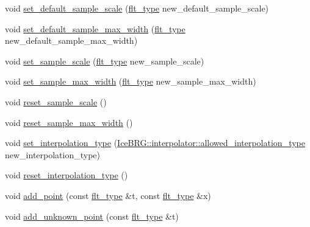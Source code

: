 \begin{DoxyCompactItemize}
\item 
void \hyperlink{classIceBRG_1_1interpolator__derivative_a626f3afc4eb2914fd03448cee55f1c0a}{set\+\_\+default\+\_\+sample\+\_\+scale} (\hyperlink{lib_2IceBRG__main_2common_8h_ad0f130a56eeb944d9ef2692ee881ecc4}{flt\+\_\+type} new\+\_\+default\+\_\+sample\+\_\+scale)
\item 
void \hyperlink{classIceBRG_1_1interpolator__derivative_a02d5c44e6d5a71e12e4d7bd07787bfc9}{set\+\_\+default\+\_\+sample\+\_\+max\+\_\+width} (\hyperlink{lib_2IceBRG__main_2common_8h_ad0f130a56eeb944d9ef2692ee881ecc4}{flt\+\_\+type} new\+\_\+default\+\_\+sample\+\_\+max\+\_\+width)
\item 
void \hyperlink{classIceBRG_1_1interpolator__derivative_a53a00f6c302b5f4a754e4274361fbd0e}{set\+\_\+sample\+\_\+scale} (\hyperlink{lib_2IceBRG__main_2common_8h_ad0f130a56eeb944d9ef2692ee881ecc4}{flt\+\_\+type} new\+\_\+sample\+\_\+scale)
\item 
void \hyperlink{classIceBRG_1_1interpolator__derivative_a44ea2c1dfe2fc70feef1e1bc3ed14ae1}{set\+\_\+sample\+\_\+max\+\_\+width} (\hyperlink{lib_2IceBRG__main_2common_8h_ad0f130a56eeb944d9ef2692ee881ecc4}{flt\+\_\+type} new\+\_\+sample\+\_\+max\+\_\+width)
\item 
void \hyperlink{classIceBRG_1_1interpolator__derivative_ac7af1733b2e1d0d0d712cd5d48be90f9}{reset\+\_\+sample\+\_\+scale} ()
\item 
void \hyperlink{classIceBRG_1_1interpolator__derivative_a32c7264c3963118ff9e4c79fd8026b85}{reset\+\_\+sample\+\_\+max\+\_\+width} ()
\item 
void \hyperlink{classIceBRG_1_1interpolator__derivative_a8ceb82dfab0402bee0aa73d04ecc0bf4}{set\+\_\+interpolation\+\_\+type} (\hyperlink{classIceBRG_1_1interpolator_af85c1c6a292cff6fa033c8884377544a}{Ice\+B\+R\+G\+::interpolator\+::allowed\+\_\+interpolation\+\_\+type} new\+\_\+interpolation\+\_\+type)
\item 
void \hyperlink{classIceBRG_1_1interpolator__derivative_a64af9890e220e1fede93254d1c98e5c8}{reset\+\_\+interpolation\+\_\+type} ()
\item 
void \hyperlink{classIceBRG_1_1interpolator__derivative_a548a8194603e520429722a5b2126bdb7}{add\+\_\+point} (const \hyperlink{lib_2IceBRG__main_2common_8h_ad0f130a56eeb944d9ef2692ee881ecc4}{flt\+\_\+type} \&t, const \hyperlink{lib_2IceBRG__main_2common_8h_ad0f130a56eeb944d9ef2692ee881ecc4}{flt\+\_\+type} \&x)
\item 
void \hyperlink{classIceBRG_1_1interpolator__derivative_a66415f79cc6541525b88b4b4671f61c6}{add\+\_\+unknown\+\_\+point} (const \hyperlink{lib_2IceBRG__main_2common_8h_ad0f130a56eeb944d9ef2692ee881ecc4}{flt\+\_\+type} \&t)

\end{DoxyCompactItemize}
